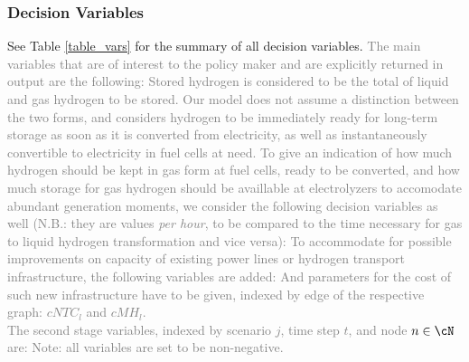 
\subsubsection{Decision Variables}
See Table \ref{table_vars} for the summary of all decision variables.
\textcolor{gray}{The main variables that are of interest to the policy maker and are explicitly returned in output are the following:
Stored hydrogen is considered to be the total of liquid and gas hydrogen to be stored. Our model does not assume a distinction between the two forms, and considers hydrogen to be immediately ready for long-term storage as soon as it is converted from electricity, as well as instantaneously convertible to electricity in fuel cells at need.
To give an indication of how much hydrogen should be kept in gas form at fuel cells, ready to be converted, and how much storage for gas hydrogen should be availlable at electrolyzers to accomodate abundant generation moments, we consider the following decision variables as well (N.B.: they are values \textit{per hour}, to be compared to the time necessary for gas to liquid hydrogen transformation and vice versa):
To accommodate for possible improvements on capacity of existing power lines or hydrogen transport infrastructure, the following variables are added:
And parameters for the cost of such new infrastructure have to be given, indexed by edge of the respective graph: $cNTC_l$ and $cMH_l$.\\
The second stage variables, indexed by scenario \(j\), time step \(t\), and node \(n \in \cN\) are:
Note: all variables are set to be non-negative.}



